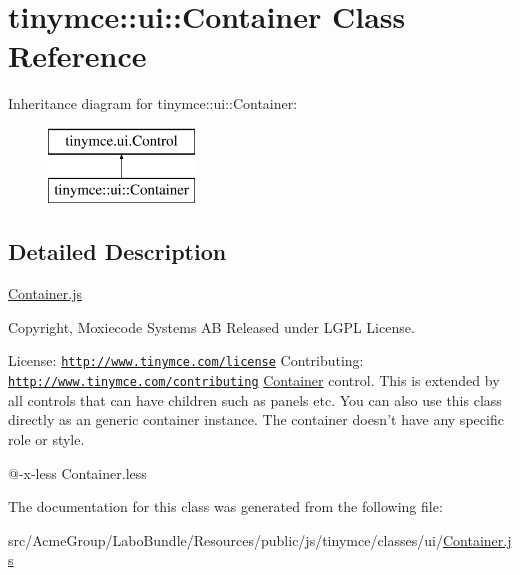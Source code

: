 \hypertarget{classtinymce_1_1ui_1_1_container}{\section{tinymce\+:\+:ui\+:\+:Container Class Reference}
\label{classtinymce_1_1ui_1_1_container}
}
Inheritance diagram for tinymce\+:\+:ui\+:\+:Container\+:\begin{figure}[H]
\begin{center}
\leavevmode
\includegraphics[height=2.000000cm]{classtinymce_1_1ui_1_1_container}
\end{center}
\end{figure}


\subsection{Detailed Description}
\hyperlink{_container_8js}{Container.\+js}

Copyright, Moxiecode Systems A\+B Released under L\+G\+P\+L License.

License\+: \href{http://www.tinymce.com/license}{\tt http\+://www.\+tinymce.\+com/license} Contributing\+: \href{http://www.tinymce.com/contributing}{\tt http\+://www.\+tinymce.\+com/contributing} \hyperlink{classtinymce_1_1ui_1_1_container}{Container} control. This is extended by all controls that can have children such as panels etc. You can also use this class directly as an generic container instance. The container doesn't have any specific role or style.

@-\/x-\/less Container.\+less 

The documentation for this class was generated from the following file\+:\begin{DoxyCompactItemize}
\item 
src/\+Acme\+Group/\+Labo\+Bundle/\+Resources/public/js/tinymce/classes/ui/\hyperlink{_container_8js}{Container.\+js}\end{DoxyCompactItemize}
